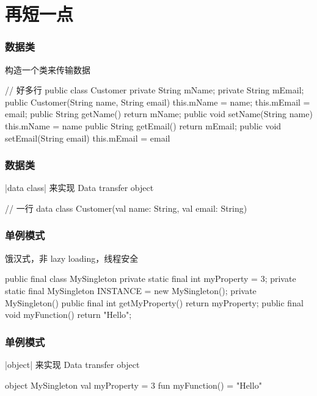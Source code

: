 \section{再短一点}
\begin{frame}[fragile]
\frametitle{数据类}
\begin{quotebox}[yzlred]
    构造一个类来传输数据
\end{quotebox}
\begin{javacode}[basicstyle=\scriptsize\ttfamily,emph={[1]Customer}]
    // 好多行
    public class Customer {
        private String mName;
        private String mEmail;
        public Customer(String name, String email) {
            this.mName = name;
            this.mEmail = email;
        }
        public String getName() { return mName; }
        public void setName(String name) { this.mName = name }
        public String getEmail() { return mEmail; }
        public void setEmail(String email) { this.mEmail = email }
    }
\end{javacode}
\end{frame}

\begin{frame}[fragile]
\frametitle{数据类}
\begin{quotebox}
    |data class| 来实现 Data transfer object
\end{quotebox}
\begin{kotlincode}[emph={[1]Customer}]
    // 一行
    data class Customer(val name: String, val email: String)
\end{kotlincode}
\end{frame}

\begin{frame}[fragile]
\frametitle{单例模式}
\begin{quotebox}[yzlred]
    饿汉式，非 lazy loading，线程安全
\end{quotebox}
\begin{javacode}[basicstyle=\scriptsize\ttfamily,emph={[1]MySingleton}]
    public final class MySingleton {
        private static final int myProperty = 3;
        private static final MySingleton INSTANCE = new MySingleton();
        private MySingleton() {}
        public final int getMyProperty() {
            return myProperty;
        }
        public final void myFunction() {
            return "Hello";
        }
    }
\end{javacode}
\end{frame}

\begin{frame}[fragile]
\frametitle{单例模式}
\begin{quotebox}
    |object| 来实现 Data transfer object
\end{quotebox}
\begin{kotlincode}[emph={[1]MySingleton}]
    object MySingleton {
        val myProperty = 3
        fun myFunction() = "Hello"
    }
\end{kotlincode}
\end{frame}

